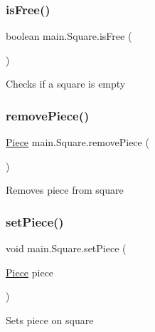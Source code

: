 \subsubsection{\texorpdfstring{is\+Free()}{isFree()}}
{\footnotesize\ttfamily boolean main.\+Square.\+is\+Free (\begin{DoxyParamCaption}{ }\end{DoxyParamCaption})\hspace{0.3cm}{\ttfamily [inline]}}

Checks if a square is empty \mbox{\label{classmain_1_1_square_a182b58082ad0f3af6d5a894ff02ebeac}} 
\subsubsection{\texorpdfstring{remove\+Piece()}{removePiece()}}
{\footnotesize\ttfamily \hyperlink{classmain_1_1pieces_1_1_piece}{Piece} main.\+Square.\+remove\+Piece (\begin{DoxyParamCaption}{ }\end{DoxyParamCaption})\hspace{0.3cm}{\ttfamily [inline]}}

Removes piece from square \mbox{\label{classmain_1_1_square_a4f5e9f6ce14d4605c6515c25c3a6022d}} 
\subsubsection{\texorpdfstring{set\+Piece()}{setPiece()}}
{\footnotesize\ttfamily void main.\+Square.\+set\+Piece (\begin{DoxyParamCaption}\item[{\hyperlink{classmain_1_1pieces_1_1_piece}{Piece}}]{piece }\end{DoxyParamCaption})\hspace{0.3cm}{\ttfamily [inline]}}

Sets piece on square \mbox{\label{classmain_1_1_square_a58f1df3521479cfc4a9aaaaf86c8de05}} 
